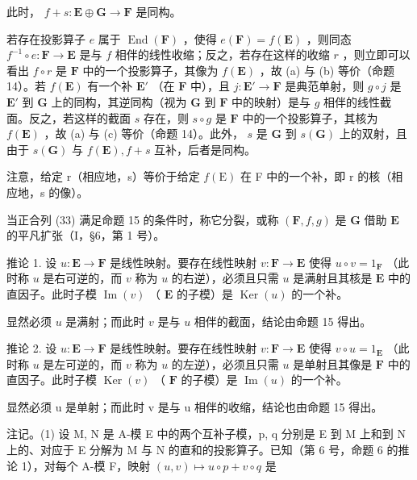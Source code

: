 此时， \(f + s: \mathbf{E} \oplus \mathbf{G} \to \mathbf{F}\) 是同构。

若存在投影算子 \(e\) 属于 \(\operatorname{End}(\mathbf{F})\) ，使得 \(e(\mathbf{F}) = f(\mathbf{E})\) ，则同态 \(f^{-1} \circ e: \mathbf{F} \to \mathbf{E}\) 是与 \(f\) 相伴的线性收缩；反之，若存在这样的收缩 \(r\) ，则立即可以看出 \(f \circ r\) 是 \(\mathbf{F}\) 中的一个投影算子，其像为 \(f(\mathbf{E})\) ，故 (a) 与 (b) 等价（命题 14）。若 \(f(\mathbf{E})\) 有一个补 \(\mathbf{E}'\) （在 \(\mathbf{F}\) 中），且 \(j: \mathbf{E}' \to \mathbf{F}\) 是典范单射，则 \(g \circ j\) 是 \(\mathbf{E}'\) 到 \(\mathbf{G}\) 上的同构，其逆同构（视为 \(\mathbf{G}\) 到 \(\mathbf{F}\) 中的映射）是与 \(g\) 相伴的线性截面。反之，若这样的截面 \(s\) 存在，则 \(s \circ g\) 是 \(\mathbf{F}\) 中的一个投影算子，其核为 \(f(\mathbf{E})\) ，故 (a) 与 (c) 等价（命题 14）。此外， \(s\) 是 \(\mathbf{G}\) 到 \(s(\mathbf{G})\) 上的双射，且由于 \(s(\mathbf{G})\) 与 \(f(\mathbf{E}), f + s\) 互补，后者是同构。

注意，给定 r（相应地，s）等价于给定 \(f(\mathrm{E})\) 在 F 中的一个补，即 r 的核（相应地，s 的像）。

当正合列 (33) 满足命题 15 的条件时，称它分裂，或称 \((\mathbf{F}, f, g)\) 是 \(\mathbf{G}\) 借助 \(\mathbf{E}\) 的平凡扩张（I，§6，第 1 号）。

推论 1. 设 \(u: \mathbf{E} \to \mathbf{F}\) 是线性映射。要存在线性映射 \(v: \mathbf{F} \to \mathbf{E}\) 使得 \(u \circ v = 1_{\mathbf{F}}\) （此时称 \(u\) 是右可逆的，而 \(v\) 称为 \(u\) 的右逆），必须且只需 \(u\) 是满射且其核是 \(\mathbf{E}\) 中的直因子。此时子模 \(\operatorname{Im}(v)\) （ \(\mathbf{E}\) 的子模）是 \(\operatorname{Ker}(u)\) 的一个补。

显然必须 \(u\) 是满射；而此时 \(v\) 是与 \(u\) 相伴的截面，结论由命题 15 得出。

推论 2. 设 \(u: \mathbf{E} \to \mathbf{F}\) 是线性映射。要存在线性映射 \(v: \mathbf{F} \to \mathbf{E}\) 使得 \(v \circ u = 1_{\mathbf{E}}\) （此时称 \(u\) 是左可逆的，而 \(v\) 称为 \(u\) 的左逆），必须且只需 \(u\) 是单射且其像是 \(\mathbf{F}\) 中的直因子。此时子模 \(\operatorname{Ker}(v)\) （ \(\mathbf{F}\) 的子模）是 \(\operatorname{Im}(u)\) 的一个补。

显然必须 u 是单射；而此时 v 是与 u 相伴的收缩，结论也由命题 15 得出。

注记。(1) 设 M, N 是 A-模 E 中的两个互补子模，p, q 分别是 E 到 M 上和到 N 上的、对应于 E 分解为 M 与 N 的直和的投影算子。已知（第 6 号，命题 6 的推论 1），对每个 A-模 F，映射 \((u, v) \mapsto u \circ p + v \circ q\) 是


